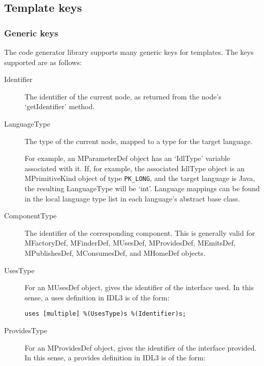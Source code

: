 \subsection{Template keys}
\label{subsection-template-keys}

\subsubsection{Generic keys}

The code generator library supports many generic keys for templates. The keys
supported are as follows:

\begin{description}

\item [Identifier] The identifier of the current node, as returned from the
      node's `getIdentifier' method.

\item [LanguageType] The type of the current node, mapped to a type for the
      target language.

      For example, an MParameterDef object has an `IdlType' variable associated
      with it. If, for example, the associated IdlType object is an
      MPrimitiveKind object of type {\tt PK\_LONG}, and the target language is
      Java, the resulting LanguageType will be `int'. Language mappings can be
      found in the local language type list in each language's abstract base
      class.

\item [ComponentType] The identifier of the corresponding component. This is
      generally valid for MFactoryDef, MFinderDef, MUsesDef, MProvidesDef,
      MEmitsDef, MPublishesDef, MConsumesDef, and MHomeDef objects.

\item [UsesType] For an MUsesDef object, gives the identifier of the interface
      used. In this sense, a uses definition in IDL3 is of the form:

\begin{verbatim}
uses [multiple] %(UsesType)s %(Identifier)s;
\end{verbatim}

\item [ProvidesType] For an MProvidesDef object, gives the identifier of the
      interface provided. In this sense, a provides definition in IDL3 is of the
      form:


\end{description}
